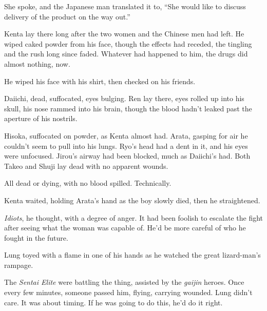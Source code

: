 She spoke, and the Japanese man translated it to, ``She would like to discuss delivery of the product on the way out.''



Kenta lay there long after the two women and the Chinese men had left.  He wiped caked powder from his face, though the effects had receded, the tingling and the rush long since faded.  Whatever had happened to him, the drugs did almost nothing, now.



He wiped his face with his shirt, then checked on his friends.



Daiichi, dead, suffocated, eyes bulging.  Ren lay there, eyes rolled up into his skull, his nose rammed into his brain, though the blood hadn't leaked past the aperture of his nostrils.



Hisoka, suffocated on powder, as Kenta almost had.  Arata, gasping for air he couldn't seem to pull into his lungs.  Ryo's head had a dent in it, and his eyes were unfocused.  Jirou's airway had been blocked, much as Daiichi's had.  Both Takeo and Shuji lay dead with no apparent wounds.



All dead or dying, with no blood spilled.  Technically.



Kenta waited, holding Arata's hand as the boy slowly died, then he straightened.



\emph{Idiots}, he thought, with a degree of anger.  It had been foolish to escalate the fight after seeing what the woman was capable of.  He'd be more careful of who he fought in the future.



\sectionbreak






Lung toyed with a flame in one of his hands as he watched the great lizard-man's rampage.



The \emph{Sentai Elite }were battling the thing, assisted by the \emph{gaijin} heroes.  Once every few minutes, someone passed him, flying, carrying wounded.  Lung didn't care.  It was about timing.  If he was going to do this, he'd do it right.



